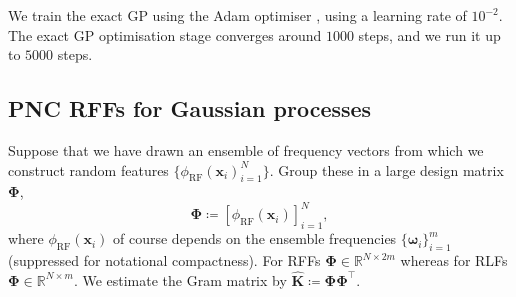 We train the exact GP using the Adam optimiser \citep{kingma2014adam}, using a learning rate of $10^{-2}.$
The exact GP optimisation stage converges around $1000$ steps, and we run it up to $5000$ steps.


\subsection{PNC RFFs for Gaussian processes} \label{app:are_predictions_improved?}
Suppose that we have drawn an ensemble of frequency vectors from which we construct random features $\{\phi_{\text{RF}}(\boldsymbol{x}_i)_{i=1}^N\}$. 
Group these in a large design matrix $\boldsymbol{\Phi}$,
\begin{equation}
    \boldsymbol{\Phi} \coloneqq [\phi_{\text{RF}}(\boldsymbol{x}_i)]_{i=1}^N,
\end{equation}
where $\phi_{\text{RF}}(\boldsymbol{x}_i)$ of course depends on the ensemble frequencies $\{\boldsymbol{\omega}_i\}_{i=1}^m$ (suppressed for notational compactness).
For RFFs $\boldsymbol{\Phi} \in \mathbb{R}^{N \times 2m}$ whereas for RLFs $\boldsymbol{\Phi} \in \mathbb{R}^{N \times m}$.
We estimate the Gram matrix by $\widehat{\mathbf{K}} \coloneqq \boldsymbol{\Phi} \boldsymbol{\Phi}^\top$.

